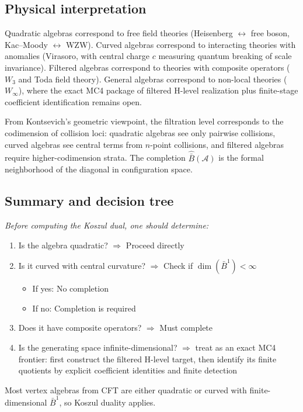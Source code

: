 \subsection{Physical interpretation}

Quadratic algebras correspond to free field theories (Heisenberg $\leftrightarrow$ free boson, Kac--Moody $\leftrightarrow$ WZW).  Curved algebras correspond to interacting theories with anomalies (Virasoro, with central charge $c$ measuring quantum breaking of scale invariance).  Filtered algebras correspond to theories with composite operators ($W_3$ and Toda field theory).  General algebras correspond to non-local theories ($W_\infty$), where the exact MC4 package of filtered H-level realization plus finite-stage coefficient identification remains open.

From Kontsevich's geometric viewpoint, the filtration level corresponds to the codimension of collision loci: quadratic algebras see only pairwise collisions, curved algebras see central terms from $n$-point collisions, and filtered algebras require higher-codimension strata.  The completion $\widehat{\bar{B}}(\mathcal{A})$ is the formal neighborhood of the diagonal in configuration space.

\subsection{Summary and decision tree}

\begin{remark}\label{rem:practitioner-takeaway}
\emph{Before computing the Koszul dual, one should determine:}
\begin{enumerate}
\item Is the algebra quadratic? $\Rightarrow$ Proceed directly
\item Is it curved with central curvature? $\Rightarrow$ Check if $\dim(\bar{B}^1) < \infty$
  \begin{itemize}
  \item If yes: No completion
  \item If no: Completion is required
  \end{itemize}
\item Does it have composite operators? $\Rightarrow$ Must complete
\item Is the generating space infinite-dimensional? $\Rightarrow$ treat as an exact MC4 frontier: first construct the filtered H-level target, then identify its finite quotients by explicit coefficient identities and finite detection
\end{enumerate}

Most vertex algebras from CFT are either quadratic or curved with finite-dimensional
$\bar{B}^1$, so Koszul duality applies.
\end{remark}

